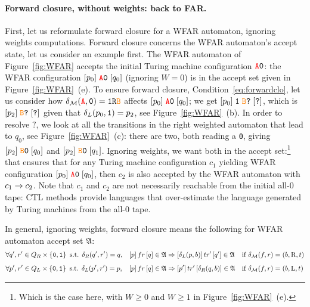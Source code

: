 \paragraph{Forward closure, without weights: back to FAR.} First, let us reformulate forward closure for a WFAR automaton, ignoring weights computations. Forward closure concerns the WFAR automaton's accept state, let us consider an example first. The WFAR automaton of Figure~\ref{fig:WFAR} accepts the initial Turing machine configuration $\texttt{\stateA}\szero$: the WFAR configuration $[p_0] \; \texttt{\stateA}\szero\; [q_0]$ (ignoring $W=0$) is in the accept set given in Figure~\ref{fig:WFAR}~(e). To ensure forward closure, Condition~\ref{eq:forwardclo}, let us consider how $\delta_\mathcal{M}(\texttt{\stateA},\szero) = \texttt{1R\stateB}$ affects $[p_0] \; \texttt{\stateA}\szero\; [q_0]$; we get $[p_0] \; \texttt{1}\; \texttt{\stateB}\texttt{?}\; [\texttt{?}]$, which is $[p_2] \; \texttt{\stateB}\texttt{?}\; [\texttt{?}]$ given that $\delta_L(p_0,\texttt{1}) = p_2$, see Figure~\ref{fig:WFAR}~(b). In order to resolve $\texttt{?}$, we look at all the transitions in the right weighted automaton that lead to $q_0$, see Figure~\ref{fig:WFAR}~(c): there are two, both reading a \texttt{0}, giving $[p_2] \; \texttt{\stateB}\texttt{0}\; [q_0]$ and $[p_2] \; \texttt{\stateB}\texttt{0}\; [q_1]$. Ignoring weights, we want both in the accept set:\footnote{Which is the case here, with $W\geq 0$ and $W \geq 1$ in Figure~\ref{fig:WFAR}~(e).} that ensures that for any Turing machine configuration $c_1$ yielding WFAR configuration $[p_0] \; \texttt{\stateA}\szero\; [q_0]$, then $c_2$ is also accepted by the WFAR automaton with $c_1 \to c_2$. Note that $c_1$ and $c_2$ are not necessarily reachable from the initial all-0 tape: CTL methods provide languages that over-estimate the language generated by Turing machines from the all-0 tape.

In general, ignoring weights, forward closure means the following for WFAR automaton accept set $\mathfrak{A}$:
\begin{align}
     & \forall q', r' \in Q_R \times \left\{\texttt{0},\texttt{1}\right\} \text{ s.t. } \delta_R(q', r') = q,
     &                                                                              & [p]\, fr\, [q] \in \mathfrak{A} \Rightarrow [\delta_L(p,b)]\, tr'\, [q'] \in \mathfrak{A}
     &                                                                              & \text{if } \delta_{\mathcal{M}}(f,r) = (b, \text{R}, t) \label{eq:forwardcloR}
    \\[0.5em]
     & \forall p', r' \in Q_L\times \left\{\texttt{0},\texttt{1}\right\} \text{ s.t. } \delta_L(p', r') = p,
     &                                                                              & [p]\, fr\, [q] \in \mathfrak{A} \Rightarrow [p']\, tr'\, [\delta_R(q,b)] \in \mathfrak{A}
     &                                                                              & \text{if } \delta_{\mathcal{M}}(f,r) = (b, \text{L}, t) \label{eq:forwardcloL}
\end{align}

